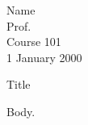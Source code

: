 \documentclass[12pt, letterpaper]{article}
\begin{document}
Name \\
Prof. \\
Course 101 \\
1 January 2000
\begin{center}
    Title
\end{center}\par

Body.

\end{document}

